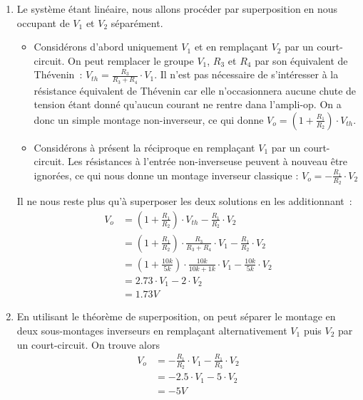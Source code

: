 \documentclass{../../template/tp}
\begin{document}
{
    \begin{enumerate}[label=\alph*)]
        \item Le système étant linéaire, nous allons procéder par superposition en nous occupant de $V_1$ et $V_2$ séparément.
        \begin{itemize}
            \item Considérons d'abord uniquement $V_1$ et en remplaçant $V_2$ par un court-circuit.
            On peut remplacer le groupe $V_1$, $R_3$ et $R_4$ par son équivalent de Thévenin~: $V_{th} = \frac{R_3}{R_3 + R_4} \cdot V_1$.
            Il n'est pas nécessaire de s'intéresser à la résistance équivalent de Thévenin car elle n'occasionnera aucune chute de tension étant donné qu'aucun courant ne rentre dana l'ampli-op.
            On a donc un simple montage non-inverseur, ce qui donne $V_o = (1+\frac{R_1}{R_2}) \cdot V_{th}$.

            \item Considérons à présent la réciproque en remplaçant $V_1$ par un court-circuit.
            Les résistances à l'entrée non-inverseuse peuvent à nouveau être ignorées, ce qui nous donne un montage inverseur classique :
            $V_o = -\frac{R_1}{R_2} \cdot V_2$
        \end{itemize}

        Il ne nous reste plus qu'à superposer les deux solutions en les additionnant~:
        \begin{align*}
        V_o & = (1+\frac{R_1}{R_2}) \cdot V_{th} - \frac{R_1}{R_2} \cdot V_2 \\
        & = (1+\frac{R_1}{R_2}) \cdot \frac{R_3}{R_3 + R_4} \cdot V_1 - \frac{R_1}{R_2} \cdot V_2 \\
        & = (1+\frac{10k}{5k}) \cdot \frac{10k}{10k + 1k} \cdot V_1 - \frac{10k}{5k} \cdot V_2 \\
        & = 2.73 \cdot V_1 - 2 \cdot V_2 \\
        & = 1.73 V
        \end{align*}

        \item En utilisant le théorème de superposition, on peut séparer le montage en deux sous-montages inverseurs en remplaçant alternativement $V_1$ puis $V_2$ par un court-circuit.
        On trouve alors 
        \begin{align*}
        V_o & = -\frac{R_1}{R_2} \cdot V_1 - \frac{R_1}{R_3} \cdot V_2 \\
        & = - 2.5 \cdot V_1 - 5 \cdot V_2 \\
        & = -5V
        \end{align*}
    \end{enumerate}
}
\end{document}
